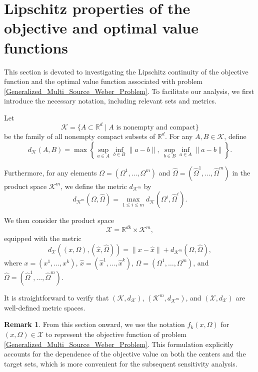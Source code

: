 \documentclass[sn-mathphys-num]{sn-jnl}%
\def\Hat{\widehat}
\theoremstyle{definition}
\newtheorem{remark}[theorem]{Remark}
\begin{document}
\section{Lipschitz properties of the objective and optimal value functions}\label{lip}

This section is devoted to investigating the Lipschitz continuity of the objective function and the optimal value function associated with problem \eqref{Generalized_Multi_Source_Weber_Problem}. To facilitate our analysis, we first introduce the necessary notation, including relevant sets and metrics.


Let 
\[
\mathcal{K}=\{A \subset \mathbb{R}^d \mid A \text{ is nonempty and compact}\}
\]
be the family of all nonempty compact subsets of $\mathbb{R}^d$. For any $A,B \in \mathcal{K}$, define
\begin{equation}\label{dk}
	d_{\mathcal{K}}(A,B)=\max\left\{ \sup_{a\in A}\inf_{b\in B}\|a-b\|,\ \sup_{b\in B}\inf_{a\in A}\|a-b\| \right\}.    
\end{equation}

Furthermore, for any elements $\Omega = (\Omega^1, \dots, \Omega^m)$ and $\Hat\Omega = (\Hat\Omega^1, \dots, \Hat\Omega^m)$ in the product space $\mathcal{K}^m$, we define the metric $d_{\mathcal{K}^m}$ by
\begin{equation}\label{dkm}
	d_{\mathcal{K}^m}(\Omega, \Hat\Omega) = \max_{1 \leq i \leq m} d_{\mathcal{K}}(\Omega^i, \Hat\Omega^i).  
\end{equation}

We then consider the product space
\[
\mathcal{X}= \mathbb{R}^{dk}\times \mathcal{K}^m,
\]
equipped with the metric
\begin{equation}\label{dX}
	d_\mathcal{X}((x,\Omega),(\Hat x,\Hat \Omega))=\| x-\Hat x\|+d_{\mathcal{K}^m}(\Omega,\Hat \Omega),
\end{equation}
where $x=(x^1,\dots,x^k)$, $\Hat x=(\Hat x^1,\dots,\Hat x^k)$, $\Omega=(\Omega^1,\dots,\Omega^m)$, and $\Hat \Omega=(\Hat \Omega^1,\dots,\Hat \Omega^m)$.


It is straightforward to verify that $(\mathcal{K}, d_{\mathcal{K}})$, $(\mathcal{K}^m, d_{\mathcal{K}^m})$, and $(\mathcal{X}, d_{\mathcal{X}})$ are well-defined metric spaces.

\begin{remark}From this section onward, we use the notation $f_k(x, \Omega)$ for $(x, \Omega) \in \mathcal{X}$ to represent the objective function of problem \eqref{Generalized_Multi_Source_Weber_Problem}. This formulation explicitly accounts for the dependence of the objective value on both the centers and the target sets, which is more convenient for the subsequent sensitivity analysis.\end{remark}
\end{document}
